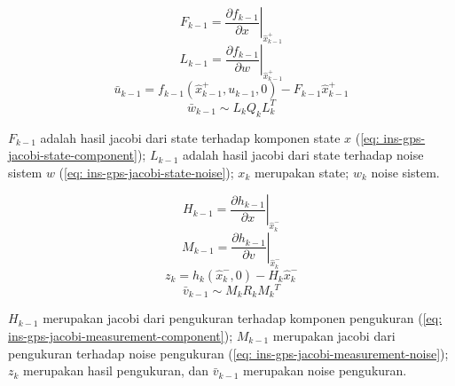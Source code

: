 \begin{frame}[allowframebreaks]
    \pagebreak

    \begin{equation}
        F_{k-1}=\left.\frac{\partial f_{k-1}}{\partial x}\right|_{\hat{x}_{k-1}^{+}}
        \label{eq: ins-gps-jacobi-state-component}
    \end{equation}
    \begin{equation}
        L_{k-1}=\left.\frac{\partial f_{k-1}}{\partial w}\right|_{\hat{x}_{k-1}^{+}}
        \label{eq: ins-gps-jacobi-state-noise}
    \end{equation}
    \begin{equation}
        \bar{u}_{k-1}=f_{k-1}\left(\hat{x}_{k-1}^{+}, u_{k-1}, 0\right)-F_{k-1} \hat{x}_{k-1}^{+}
    \end{equation}
    \begin{equation}
        \bar{w}_{k-1} \sim L_{k} Q_{k} L_{k}^{T}
    \end{equation}

    $F_{k-1}$ adalah hasil jacobi dari state terhadap komponen state $x$ (\ref{eq: ins-gps-jacobi-state-component}); $L_{k-1}$ adalah hasil jacobi dari state terhadap noise sistem $w$ (\ref{eq: ins-gps-jacobi-state-noise}); $x_k$ merupakan state; $w_k$ noise sistem.

    \pagebreak

    \begin{equation}
        H_{k-1}=\left.\frac{\partial h_{k-1}}{\partial x}\right|_{\hat{x}_{k}^{-}}
        \label{eq: ins-gps-jacobi-measurement-component}
    \end{equation}
    \begin{equation}
        M_{k-1}=\left.\frac{\partial h_{k-1}}{\partial v}\right|_{\hat{x}_{k}^{-}}
        \label{eq: ins-gps-jacobi-measurement-noise}
    \end{equation}
    \begin{equation}
        z_{k}=h_{k}\left(\hat{x}_{k}^{-}, 0\right)-H_{k} \hat{x}_{k}^{-}
    \end{equation}
    \begin{equation}
        \bar{v}_{k-1} \sim M_{k} R_{k} M_{k}{ }^{T}
    \end{equation}

    $H_{k-1}$ merupakan jacobi dari pengukuran terhadap komponen pengukuran (\ref{eq: ins-gps-jacobi-measurement-component}); $M_{k-1}$ merupakan jacobi dari pengukuran terhadap noise pengukuran (\ref{eq: ins-gps-jacobi-measurement-noise}); $z_{k}$ merupakan hasil pengukuran, dan $\bar{v}_{k-1}$ merupakan noise pengukuran.
\end{frame}


